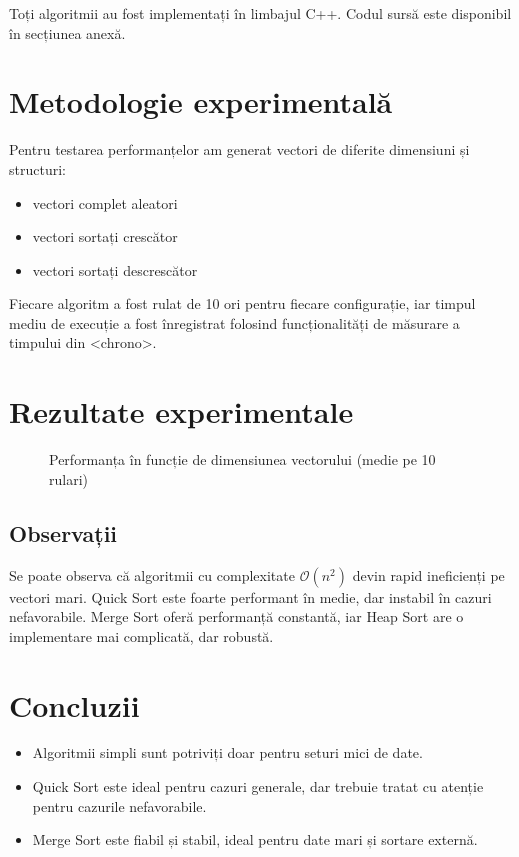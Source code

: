 \documentclass[12pt]{article}
\begin{document}
Toți algoritmii au fost implementați în limbajul C++. Codul sursă este disponibil în secțiunea anexă.

\section{Metodologie experimentală}

Pentru testarea performanțelor am generat vectori de diferite dimensiuni și structuri:
\begin{itemize}
    \item vectori complet aleatori
    \item vectori sortați crescător
    \item vectori sortați descrescător
\end{itemize}
Fiecare algoritm a fost rulat de 10 ori pentru fiecare configurație, iar timpul mediu de execuție a fost înregistrat folosind funcționalități de măsurare a timpului din <chrono>.

\section{Rezultate experimentale}

\begin{figure}[H]
\centering
\caption{Performanța în funcție de dimensiunea vectorului (medie pe 10 rulari)}
\end{figure}

\subsection{Observații}

Se poate observa că algoritmii cu complexitate $\mathcal{O}(n^2)$ devin rapid ineficienți pe vectori mari. Quick Sort este foarte performant în medie, dar instabil în cazuri nefavorabile. Merge Sort oferă performanță constantă, iar Heap Sort are o implementare mai complicată, dar robustă.

\section{Concluzii}

\begin{itemize}
    \item Algoritmii simpli sunt potriviți doar pentru seturi mici de date.
    \item Quick Sort este ideal pentru cazuri generale, dar trebuie tratat cu atenție pentru cazurile nefavorabile.
    \item Merge Sort este fiabil și stabil, ideal pentru date mari și sortare externă.
\end{itemize}
\end{document}
